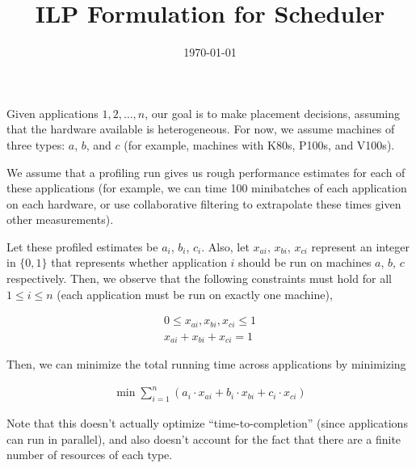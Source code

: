 \documentclass{article}
\title{ILP Formulation for Scheduler}
\date{\today}
\begin{document}
\maketitle

Given applications $1, 2, \ldots, n$, our goal is to make placement
decisions, assuming that the hardware available is heterogeneous. For now, we
assume machines of three types: $a$, $b$, and $c$ (for example, machines with
K80s, P100s, and V100s).

We assume that a profiling run gives us rough performance estimates for each
of these applications (for example, we can time 100 minibatches of each application
on each hardware, or use collaborative filtering to extrapolate these
times given other measurements).

Let these profiled estimates be $a_i$, $b_i$, $c_i$. Also, let $x_{ai}$, $x_{bi}$, $x_{ci}$ represent
an integer in $\{0, 1\}$ that represents whether application $i$ should be run on
machines $a$, $b$, $c$ respectively. Then, we observe that the following constraints
must hold for all $1 \leq i \leq n$ (each application must be run on exactly
one machine),

\begin{eqnarray}
0 \leq x_{ai}, x_{bi}, x_{ci} \leq 1 \nonumber \\
x_{ai} + x_{bi} + x_{ci} = 1 \nonumber
\end{eqnarray}

Then, we can minimize the total running time across applications by minimizing

\begin{eqnarray}
\min \sum_{i=1}^n (a_i \cdot x_{ai} + b_i \cdot x_{bi} + c_i \cdot x_{ci}) \nonumber
\end{eqnarray}

Note that this doesn't actually optimize ``time-to-completion'' (since applications
can run in parallel), and also doesn't account for the fact that
there are a finite number of resources of each type.
\end{document}
